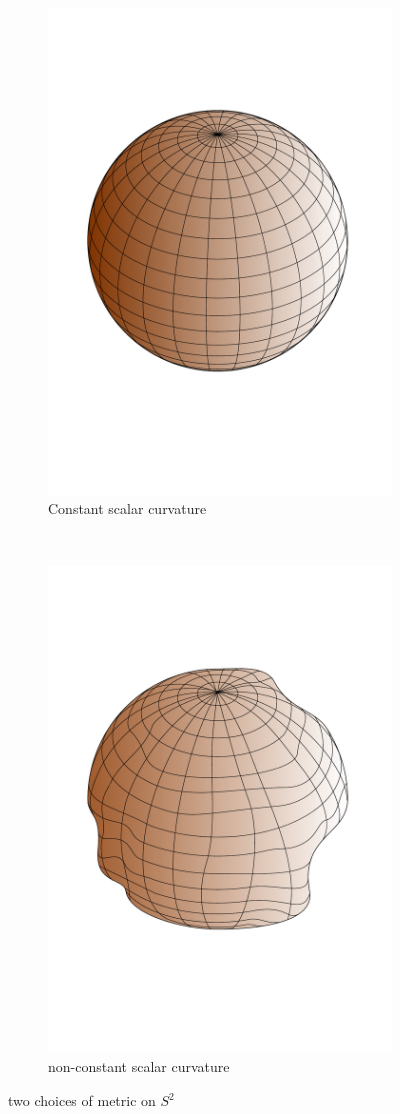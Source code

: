 \begin{figure}[h!] \label{fig1}
    \centering
    \begin{subfigure}[t]{0.4\textwidth}
        \centering
        \includegraphics[height=\textwidth]{sphere}
        \caption{Constant scalar curvature}
    \end{subfigure}%
    ~ 
    \begin{subfigure}[t]{0.4\textwidth}
        \centering
        \includegraphics[height=\textwidth]{notsphere}
        \caption{non-constant scalar curvature}
    \end{subfigure}
    \caption{two choices of metric on \(S^2\)}
\end{figure}



